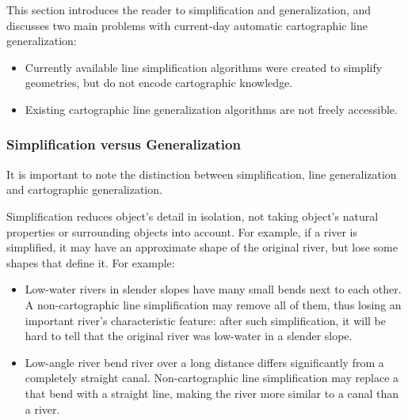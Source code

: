 \documentclass[a4paper]{article}
\begin{document}

This section introduces the reader to simplification and generalization, and
discusses two main problems with current-day automatic cartographic line
generalization:

\begin{itemize}
    \item Currently available line simplification algorithms were created
        to simplify geometries, but do not encode cartographic knowledge.

    \item Existing cartographic line generalization algorithms are not freely
        accessible.
\end{itemize}

\subsubsection{Simplification versus Generalization}

It is important to note the distinction between simplification, line
generalization and cartographic generalization.

Simplification reduces object's detail in isolation, not taking object's
natural properties or surrounding objects into account. For example, if a
river is simplified, it may have an approximate shape of the original river,
but lose some shapes that define it. For example:

\begin{itemize}

  \item Low-water rivers in slender slopes have many small bends next to each
      other. A non-cartographic line simplification may remove all of them,
        thus losing an important river's characteristic feature: after such
        simplification, it will be hard to tell that the original river was
        low-water in a slender slope.

  \item Low-angle river bend river over a long distance differs significantly
      from a completely straight canal. Non-cartographic line simplification
        may replace a that bend with a straight line, making the river more
        similar to a canal than a river.

\end{itemize}
\end{document}
